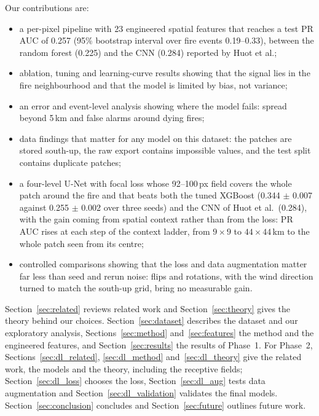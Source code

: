 Our contributions are:
\begin{itemize}
\item a per-pixel pipeline with 23 engineered spatial features that reaches a test PR AUC of 0.257
  (95\% bootstrap interval over fire events 0.19--0.33), between the random forest (0.225) and the
  CNN (0.284) reported by Huot et al.;
\item ablation, tuning and learning-curve results showing that the signal lies in the fire
  neighbourhood and that the model is limited by bias, not variance;
\item an error and event-level analysis showing where the model fails: spread beyond 5\,km and
  false alarms around dying fires;
\item data findings that matter for any model on this dataset: the patches are stored south-up,
  the raw export contains impossible values, and the test split contains duplicate patches;
\item a four-level U-Net with focal loss whose 92--100\,px field covers the whole patch around the fire and that beats both the tuned XGBoost
  (0.344 $\pm$ 0.007 against 0.255 $\pm$ 0.002 over three seeds) and the CNN of Huot et al.\ (0.284), with
  the gain coming from spatial context rather than from the loss: PR AUC rises at each step of the context
  ladder, from $9\times9$ to $44\times44$\,km to the whole patch seen from its centre;
\item controlled comparisons showing that the loss and data augmentation matter far less than seed and
  rerun noise: flips and rotations, with the wind direction turned to match the south-up grid, bring no
  measurable gain.
\end{itemize}

Section~\ref{sec:related} reviews related work and Section~\ref{sec:theory} gives the theory behind
our choices. Section~\ref{sec:dataset} describes the dataset and our exploratory analysis,
Sections~\ref{sec:method} and~\ref{sec:features} the method and the engineered features, and
Section~\ref{sec:results} the results of Phase~1. For Phase~2, Sections~\ref{sec:dl_related},
\ref{sec:dl_method} and~\ref{sec:dl_theory} give the related work, the models and the theory, including
the receptive fields; Section~\ref{sec:dl_loss} chooses the loss,
Section~\ref{sec:dl_aug} tests data augmentation and Section~\ref{sec:dl_validation} validates the final
models. Section~\ref{sec:conclusion} concludes and Section~\ref{sec:future} outlines future work.
